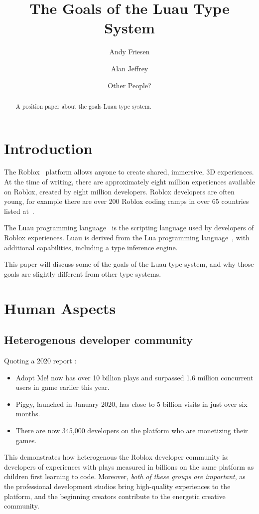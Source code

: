 \documentclass[acmsmall]{acmart}
\begin{document}
\title{The Goals of the Luau Type System}

\author{Andy Friesen}
\author{Alan Jeffrey}
\author{Other People?}

\begin{abstract}
  A position paper about the goals Luau type system.
\end{abstract}

\maketitle

\section{Introduction}

The Roblox~\cite{Roblox} platform allows anyone to create shared,
immersive, 3D experiences.  At the time of writing, there are
approximately eight million experiences available on Roblox, created
by eight million developers.  Roblox developers are often young, for
example there are over 200 Roblox coding camps in over 65 countries
listed at~\cite{AllEducators}.

The Luau programming language~\cite{Luau} is the scripting language
used by developers of Roblox experiences. Luau is derived from the Lua
programming language~\cite{Lua}, with additional capabilities,
including a type inference engine.

This paper will discuss some of the goals of the Luau type system, and
why those goals are slightly different from other type systems.

\section{Human Aspects}
\subsection{Heterogenous developer community}

Quoting a 2020 report \cite{RobloxDevelopers}:
\begin{itemize}
\item Adopt Me! now has over 10 billion plays and surpassed 1.6 million concurrent users in game earlier this year.
\item Piggy, launched in January 2020, has close to 5 billion visits in just over six months.
\item There are now 345,000 developers on the platform who are monetizing their games.
\end{itemize}
This demonstrates how heterogenous the Roblox developer community is:
developers of experiences with plays measured in billions on the same
platform as children first learning to code. Moreover, \emph{both of
these groups are important}, as the professional development studios
bring high-quality experiences to the platform, and the beginning creators
contribute to the energetic creative community.
\end{document}
